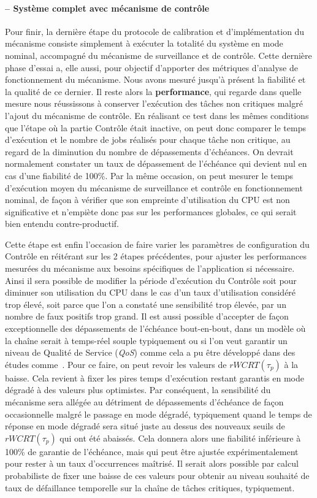 \documentclass[french, a4paper, 11pt, twoside, pdftex]{StyleThese}
\begin{document}
		\paragraph{ -- Système complet avec mécanisme de contrôle}
		 Pour finir, la dernière étape du protocole de calibration et d'implémentation du mécanisme consiste simplement à exécuter la totalité du système en mode nominal, accompagné du mécanisme de surveillance et de contrôle. 
		 Cette dernière phase d'essai a, elle aussi, pour objectif d'apporter des métriques d'analyse de fonctionnement du mécanisme. Nous avons mesuré jusqu'à présent la fiabilité et la qualité de ce dernier. Il reste alors la \textbf{performance}, qui regarde dans quelle mesure nous réussissons à conserver l'exécution des tâches non critiques malgré l'ajout du mécanisme de contrôle.
		 En réalisant ce test dans les mêmes conditions que l'étape  où la partie Contrôle était inactive, on peut donc comparer le temps d'exécution et le nombre de jobs réalisés pour chaque tâche non critique, au regard de la diminution du nombre de dépassements d'échéances. On devrait normalement constater un taux de dépassement de l'échéance qui devient nul en cas d'une fiabilité de 100\%.
		 Par la même occasion, on peut mesurer le temps d'exécution moyen du mécanisme de surveillance et contrôle en fonctionnement nominal, de façon à vérifier que son empreinte d'utilisation du CPU est non significative et n'empiète donc pas sur les performances globales, ce qui serait bien entendu contre-productif.
		 
		 Cette étape est enfin l'occasion de faire varier les paramètres de configuration du Contrôle en réitérant sur les 2 étapes précédentes, pour ajuster les performances mesurées du mécanisme aux besoins spécifiques de l'application si nécessaire. Ainsi il sera possible de modifier la période d'exécution du Contrôle soit  pour diminuer son utilisation du CPU dans le cas d'un taux d'utilisation considéré trop élevé, soit parce que l'on a constaté une sensibilité trop élevée, par un nombre de faux positifs trop grand.
		 Il est aussi possible d'accepter de façon exceptionnelle des dépassements de l'échéance bout-en-bout, dans un modèle où la chaîne serait à temps-réel souple typiquement ou si l'on veut garantir un niveau de Qualité de Service (\textit{QoS}) comme cela a pu être développé dans des études comme~\cite{lin_maximizing_2006}. Pour ce faire, on peut revoir les valeurs de $rWCRT(\tau_p)$ à la baisse. Cela revient à fixer les pires temps d'exécution restant garantis en mode dégradé à des valeurs plus optimistes. Par conséquent, la sensibilité du mécanisme sera allégée au détriment de dépassements d'échéance de façon occasionnelle malgré le passage en mode dégradé, typiquement quand le temps de réponse en mode dégradé sera situé juste au dessus des nouveaux seuils de $rWCRT(\tau_p)$ qui ont été abaissés. Cela donnera alors une fiabilité inférieure à 100\% de garantie de l'échéance, mais qui peut être ajustée expérimentalement pour rester à un taux d'occurrences maîtrisé. Il serait alors possible par calcul probabiliste de fixer une baisse de ces valeurs pour obtenir au niveau souhaité de taux de défaillance temporelle sur la chaîne de tâches critiques, typiquement.
		 
\end{document}
